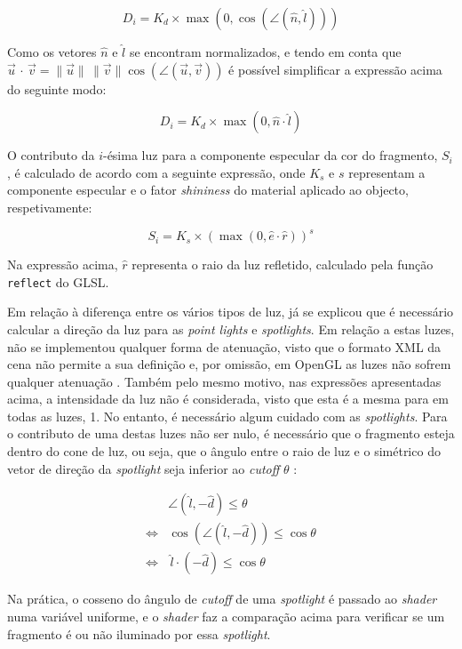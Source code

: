 \documentclass[12pt, a4paper]{article}
\begin{document}
$$
D_i = K_d \times \max \left ( 0, \cos \left ( \angle (\hat{n}, \hat{l}) \right ) \right )
$$

Como os vetores $\hat{n}$ e $\hat{l}$ se encontram normalizados, e tendo em conta que
$
\vec{u} \, \cdot \, \vec{v} =
\lVert \vec{u} \rVert \, \lVert \vec{v} \rVert \cos (\angle (\vec{u}, \vec{v}))
$
é possível simplificar a expressão acima do seguinte modo:

$$
D_i = K_d \times \max \left ( 0, \hat{n} \cdot \hat{l} \right )
$$

O contributo da $i$-ésima luz para a componente especular da cor do fragmento, $S_i$, é calculado
de acordo com a seguinte expressão, onde $K_s$ e $s$ representam a componente especular e o fator
\emph{shininess} do material aplicado ao objecto, respetivamente:

$$
S_i = K_s \times \left ( \max \left (0, \hat{e} \cdot \hat{r} \right ) \right ) ^ s
$$

Na expressão acima, $\hat{r}$ representa o raio da luz refletido, calculado pela função
\texttt{reflect} do GLSL.

Em relação à diferença entre os vários tipos de luz, já se explicou que é necessário calcular a
direção da luz para as \emph{point lights} e \emph{spotlights}. Em relação a estas luzes, não se
implementou qualquer forma de atenuação, visto que o formato XML da cena não permite a sua definição
e, por omissão, em OpenGL as luzes não sofrem qualquer atenuação \cite{glLight}. Também pelo mesmo
motivo, nas expressões apresentadas acima, a intensidade da luz não é considerada, visto que esta é
a mesma para em todas as luzes, 1. No entanto, é necessário algum cuidado com as \emph{spotlights}.
Para o contributo de uma destas luzes não ser nulo, é necessário que o fragmento esteja dentro do
cone de luz, ou seja, que o ângulo entre o raio de luz e o simétrico do vetor de direção da
\emph{spotlight} seja inferior ao \emph{cutoff} $\theta$ \cite{learn-opengl-2}:

\begin{align*}
    & \angle (\hat{l}, -\hat{d}) \le \theta \\
    \Leftrightarrow & \cos \left ( \angle (\hat{l}, -\hat{d}) \right ) \le \cos \theta \\
    \Leftrightarrow & \, \hat{l} \cdot (-\hat{d}) \le \cos \theta
\end{align*}

Na prática, o cosseno do ângulo de \emph{cutoff} de uma \emph{spotlight} é passado ao \emph{shader}
numa variável uniforme, e o \emph{shader} faz a comparação acima para verificar se um fragmento é
ou não iluminado por essa \emph{spotlight}.
\end{document}
